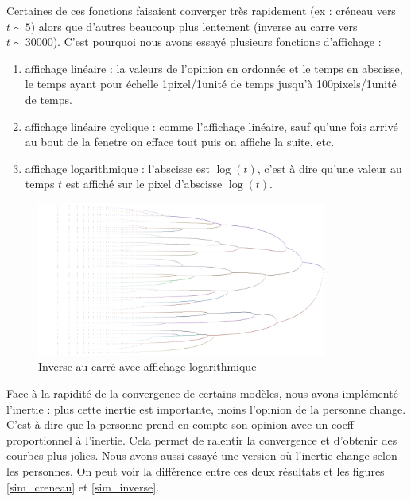 \documentclass[a4paper,10pt]{article}
\begin{document}
Certaines de ces fonctions faisaient converger très rapidement (ex : créneau vers $t \sim 5$) alors que d'autres beaucoup plus lentement (inverse au carre vers $t \sim 30000$). C'est pourquoi nous avons essayé plusieurs fonctions d'affichage :
\begin{enumerate}
\item affichage linéaire : la valeurs de l'opinion en ordonnée et le temps en abscisse, le temps ayant pour échelle 1pixel/1unité de temps jusqu'à 100pixels/1unité de temps.

\item affichage linéaire cyclique : comme l'affichage linéaire, sauf qu'une fois arrivé au bout de la fenetre on efface tout puis on affiche la suite, etc.

\item affichage logarithmique : l'abscisse est $\log(t)$, c'est à dire qu'une valeur au temps $t$ est affiché sur le pixel d'abscisse $\log(t)$.
\end{enumerate}

\begin{figure}[H]
\begin{center}
\includegraphics[width=270pt]{resultatCarreLog_inverse.png}
\end{center}
\caption{Inverse au carré avec affichage logarithmique}
\label{sim_carre_log}
\end{figure}

Face à la rapidité de la convergence de certains modèles, nous avons implémenté l'inertie : plus cette inertie est importante, moins l'opinion de la personne change. C'est à dire que la personne prend en compte son opinion avec un coeff proportionnel à l'inertie. Cela permet de ralentir la convergence et d'obtenir des courbes plus jolies.
Nous avons aussi essayé une version où l'inertie change selon les personnes. On peut voir la différence entre ces deux résultats et les figures \ref{sim_creneau} et \ref{sim_inverse}.
\end{document}
